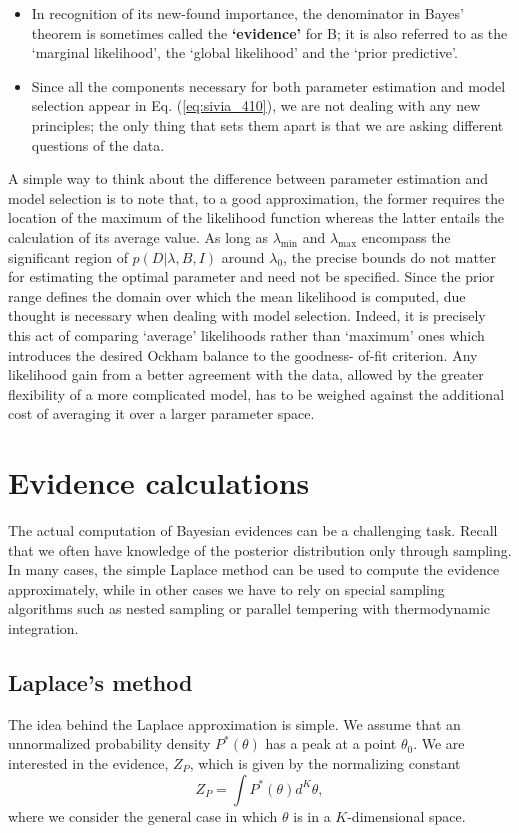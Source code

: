\documentclass[%
oneside,                 %
final,                   %
10pt]{article}
\begin{document}
\begin{itemize}
\item In recognition of its new-found importance, the denominator in Bayes’ theorem is sometimes called the \textbf{‘evidence’} for B; it is also referred to as the ‘marginal likelihood’, the ‘global likelihood’ and the ‘prior predictive’. 

\item Since all the components necessary for both parameter estimation and model selection appear in Eq. (\ref{eq:sivia_410}), we are not dealing with any new principles; the only thing that sets them apart is that we are asking different questions of the data.
\end{itemize}

\noindent
A simple way to think about the difference between parameter estimation and model selection is to note that, to a good approximation, the former requires the location of the maximum of the likelihood function whereas the latter entails the calculation of its average value. As long as $\lambda_\mathrm{min}$ and $\lambda_\mathrm{max}$ encompass the significant region of $p(D|\lambda,B,I)$ around $\lambda_0$, the precise bounds do not matter for estimating the optimal parameter and need not be specified. Since the prior range defines the domain over which the mean likelihood is computed, due thought is necessary when dealing with model selection. Indeed, it is precisely this act of comparing ‘average’ likelihoods rather than ‘maximum’ ones which introduces the desired Ockham balance to the goodness- of-fit criterion. Any likelihood gain from a better agreement with the data, allowed by the greater flexibility of a more complicated model, has to be weighed against the additional cost of averaging it over a larger parameter space.

\section{Evidence calculations}
The actual computation of Bayesian evidences can be a challenging task. Recall that we often have knowledge of the posterior distribution only through sampling. In many cases, the simple Laplace method can be used to compute the evidence approximately, while in other cases we have to rely on special sampling algorithms such as nested sampling or parallel tempering with thermodynamic integration.

\subsection{Laplace's method}
The idea behind the Laplace approximation is simple. We assume that an unnormalized probability density $P^*(\theta)$ has a peak at a point $\theta_0$. We are interested in the evidence, $Z_P$, which is given by the normalizing constant
$$
Z_P = \int P^*(\theta) d^K\theta,
$$ 
where we consider the general case in which $\theta$ is in a $K$-dimensional space. 
\end{document}
